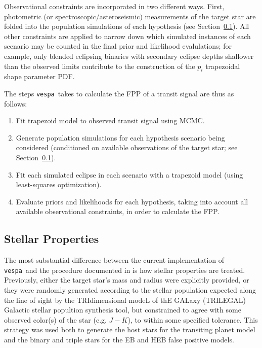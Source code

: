 \documentclass{emulateapj}
\newcommand{\sectionname}{Section}
\newcommand{\Sect}[1]{\sectionname~\ref{sect:#1}}
\newcommand{\sect}[1]{\Sect{#1}}
\newcommand{\sectlabel}[1]{\label{sect:#1}}
\newcommand{\vespa}{\texttt{vespa}}
\begin{document}
Observational constraints are incorporated in two different ways.
First, photometric (or spectroscopic/asteroseismic) measurements of
the target star are folded into the population simulations of each
hypothesis (see \sect{methods:stellar}).  All other constraints are
applied to narrow down which simulated instances of each scenario may
be counted in the final prior and likelihood evalulations; for example,
only blended eclipsing binaries with secondary eclipse depths
shallower than the observed limits contribute to the construction of
the $p_i$ trapezoidal shape parameter PDF.

The steps \vespa\ takes to calculate the FPP of a transit signal
are thus as follows:
\begin{enumerate}
\item Fit trapezoid model to observed transit signal using MCMC.
\item Generate population simulations for each hypothesis scenario
  being considered (conditioned on available observations of the
  target star; see \sect{methods:stellar}).
\item Fit each simulated eclipse in each scenario with a trapezoid
  model (using least-squares optimization).
\item Evaluate priors and likelihoods for each hypothesis, taking into
  account all available observational constraints, in order to
  calculate the FPP.
\end{enumerate}


\subsection{Stellar Properties}
\sectlabel{methods:stellar}

The most substantial difference between the current implementation of
\vespa\ and the procedure documented in  is
how stellar properties are treated.  Previously, either the target
star's mass and radius were explicitly provided, or they were randomly
generated according to the stellar population expected along the line
of sight by the TRIdimensional modeL of thE GALaxy (TRILEGAL) Galactic
stellar popultion synthesis tool, but constrained to agree with some
observed color(s) of the star (e.g. $J-K$), to within some specified
tolerance.  This strategy was used both to generate the host stars for
the transiting planet model and the binary and triple stars for the EB
and HEB false positive models.
\end{document}
